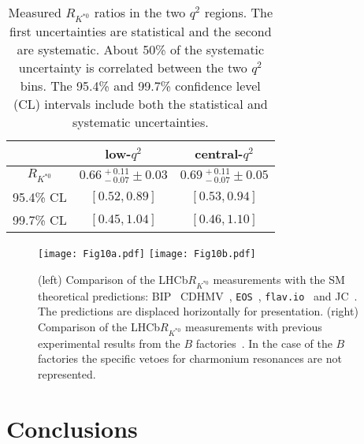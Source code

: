 \documentclass[12pt,a4paper]{article}
\def\RKst    {\mbox{R_{\Kstarz}}}
\def\lhcb {\mbox{LHCb}\xspace}
\def\PB      {\ensuremath{\mathrm{B}}\xspace}
\def\PK      {\ensuremath{\mathrm{K}}\xspace}
\def\PB      {\ensuremath{B}\xspace}
\def\PK      {\ensuremath{K}\xspace}
\def\kaon  {\ensuremath{\PK}\xspace}
\def\Kstarz  {\ensuremath{\kaon^{*0}}\xspace}
\def\B       {\ensuremath{\PB}\xspace}
\def\qsq       {\ensuremath{q^2}\xspace}
\def\lqsq{low-\qsq}
\def\cqsq{central-\qsq}
\def\RKst{\ensuremath{R_{\Kstarz}}\xspace}
\begin{document}
\begin{table}[t!]
\centering
\caption{Measured \RKst ratios in the two \qsq regions. The first uncertainties are statistical and the second are systematic. About 50\% of the systematic uncertainty is correlated between the two \qsq bins. The 95.4\% and 99.7\% confidence level (CL) intervals include both the statistical and systematic uncertainties.}
\label{tab:results}
\renewcommand\arraystretch{1.4}
\begin{tabular}{c|c|c}
			& \lqsq							& \cqsq \\ \hline 
\RKst		& $0.66~^{+~0.11}_{-~0.07} \pm 0.03$	& $0.69~^{+~0.11}_{-~0.07} \pm 0.05$ \\ \hline
95.4\% CL		& $[0.52,0.89]$						& $[0.53,0.94]$ \\
99.7\% CL		& $[0.45,1.04]$						& $[0.46,1.10]$ \\
\end{tabular}
\end{table}

\begin{figure}[t!]
\centering
\texttt{[image: Fig10a.pdf]}
\texttt{[image: Fig10b.pdf]}
\caption{(left) Comparison of the \lhcb \RKst measurements with the SM theoretical predictions: BIP~\cite{Bordone:2016gaq} CDHMV~\cite{Descotes-Genon:2015uva,Capdevila:2016ivx,Capdevila:2017ert}, \texttt{EOS}~\cite{Serra:2016ivr,EOS-Web,*EOS}, \texttt{flav.io}~\cite{Straub:2015ica,Altmannshofer:2017fio,flavio} and JC~\cite{Jager:2014rwa}. The predictions are displaced horizontally for presentation. (right) Comparison of the \lhcb \RKst measurements with previous experimental results from the \B factories~\cite{Lees:2012tva,Wei:2009zv}. In the case of the \B factories the specific vetoes for charmonium resonances are not represented.}
\label{fig:results}
\end{figure}


\section{Conclusions}
\label{sec:conclusions}
\end{document}
